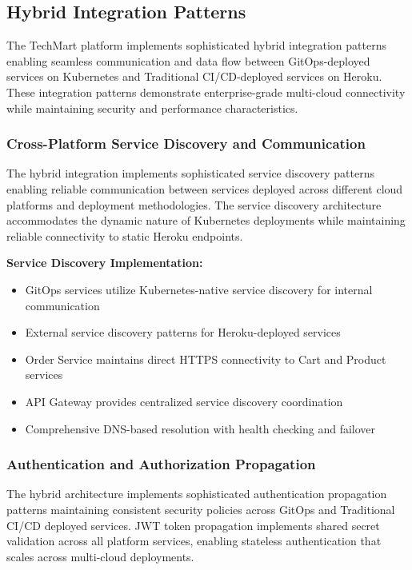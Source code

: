 \subsection{Hybrid Integration Patterns}

The TechMart platform implements sophisticated hybrid integration patterns enabling seamless communication and data flow between GitOps-deployed services on Kubernetes and Traditional CI/CD-deployed services on Heroku. These integration patterns demonstrate enterprise-grade multi-cloud connectivity while maintaining security and performance characteristics.

\subsubsection{Cross-Platform Service Discovery and Communication}

The hybrid integration implements sophisticated service discovery patterns enabling reliable communication between services deployed across different cloud platforms and deployment methodologies. The service discovery architecture accommodates the dynamic nature of Kubernetes deployments while maintaining reliable connectivity to static Heroku endpoints.

\textbf{Service Discovery Implementation:}
\begin{itemize}
\item GitOps services utilize Kubernetes-native service discovery for internal communication
\item External service discovery patterns for Heroku-deployed services
\item Order Service maintains direct HTTPS connectivity to Cart and Product services
\item API Gateway provides centralized service discovery coordination
\item Comprehensive DNS-based resolution with health checking and failover
\end{itemize}

\subsubsection{Authentication and Authorization Propagation}

The hybrid architecture implements sophisticated authentication propagation patterns maintaining consistent security policies across GitOps and Traditional CI/CD deployed services. JWT token propagation implements shared secret validation across all platform services, enabling stateless authentication that scales across multi-cloud deployments.

